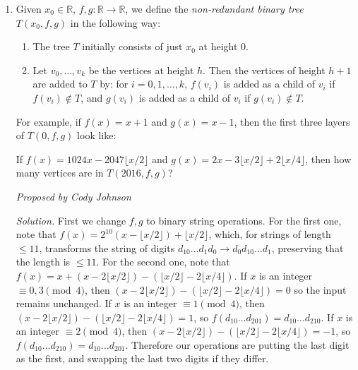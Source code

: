 \documentclass[10pt]{article}
\newcommand{\proposed}[1]
{
\vspace{5pt}
\noindent\textit{Proposed by #1}
}
\newcommand{\solution}
{
\vspace{5pt}
\noindent\textit{Solution.}\qquad
}
\begin{document}
\begin{enumerate}
\item Given $x_0\in\mathbb R$, $f,g:\mathbb R\to\mathbb R$, we define the \emph{non-redundant binary tree} $T(x_0,f,g)$ in the following way:

\begin{enumerate}
\item The tree $T$ initially consists of just $x_0$ at height $0$.

\item Let $v_0,\dots,v_k$ be the vertices at height $h$. Then the vertices of height $h+1$ are added to $T$ by: for $i=0,1,\dots,k$, $f(v_i)$ is added as a child of $v_i$ if $f(v_i)\not\in T$, and $g(v_i)$ is added as a child of $v_i$ if $g(v_i)\not\in T$.
\end{enumerate}

For example, if $f(x)=x+1$ and $g(x)=x-1$, then the first three layers of $T(0,f,g)$ look like:

\begin{center}
\end{center}

If $f(x)=1024x-2047\lfloor x/2\rfloor$ and $g(x)=2x-3\lfloor x/2\rfloor+2\lfloor x/4\rfloor$, then how many vertices are in $T(2016,f,g)$?

\proposed{Cody Johnson}

\solution First we change $f,g$ to binary string operations. For the first one, note that $f(x)=2^{10}(x-\lfloor x/2\rfloor)+\lfloor x/2\rfloor$, which, for strings of length $\le11$, transforms the string of digits $d_{10}\dots d_1d_0\to d_0d_{10}\dots d_1$, preserving that the length is $\le11$. For the second one, note that $f(x)=x+(x-2\lfloor x/2\rfloor)-(\lfloor x/2\rfloor-2\lfloor x/4\rfloor)$. If $x$ is an integer $\equiv0,3\pmod4$, then $(x-2\lfloor x/2\rfloor)-(\lfloor x/2\rfloor-2\lfloor x/4\rfloor)=0$ so the input remains unchanged. If $x$ is an integer $\equiv1\pmod4$, then $(x-2\lfloor x/2\rfloor)-(\lfloor x/2\rfloor-2\lfloor x/4\rfloor)=1$, so $f(d_{10}\dots d_201)=d_{10}\dots d_210$. If $x$ is an integer $\equiv2\pmod4$, then $(x-2\lfloor x/2\rfloor)-(\lfloor x/2\rfloor-2\lfloor x/4\rfloor)=-1$, so $f(d_{10}\dots d_210)=d_{10}\dots d_201$. Therefore our operations are putting the last digit as the first, and swapping the last two digits if they differ.


\end{enumerate}
\end{document}
